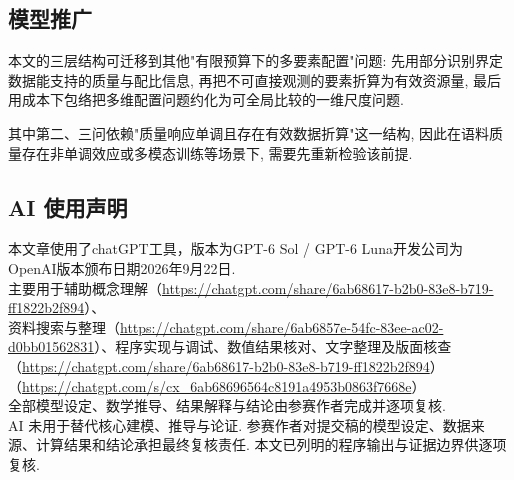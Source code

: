 \subsection{模型推广}
本文的三层结构可迁移到其他"有限预算下的多要素配置"问题: 先用部分识别界定数据能支持的质量与配比信息, 再把不可直接观测的要素折算为有效资源量, 最后用成本下包络把多维配置问题约化为可全局比较的一维尺度问题. 

其中第二、三问依赖"质量响应单调且存在有效数据折算"这一结构, 因此在语料质量存在非单调效应或多模态训练等场景下, 需要先重新检验该前提.
\subsection{AI 使用声明}
本文章使用了chatGPT工具，版本为GPT-6 Sol / GPT-6 Luna开发公司为 OpenAI版本颁布日期2026年9月22日. \\
主要用于辅助概念理解（\url{https://chatgpt.com/share/6ab68617-b2b0-83e8-b719-ff1822b2f894}）、\\
资料搜索与整理（\url{https://chatgpt.com/share/6ab6857e-54fc-83ee-ac02-d0bb01562831}）、程序实现与调试、数值结果核对、文字整理及版面核查（\url{https://chatgpt.com/share/6ab68617-b2b0-83e8-b719-ff1822b2f894}）\\（\url{https://chatgpt.com/s/cx_6ab68696564c8191a4953b0863f7668e}）\\
全部模型设定、数学推导、结果解释与结论由参赛作者完成并逐项复核.\\
AI 未用于替代核心建模、推导与论证. 参赛作者对提交稿的模型设定、数据来源、计算结果和结论承担最终复核责任. 本文已列明的程序输出与证据边界供逐项复核.